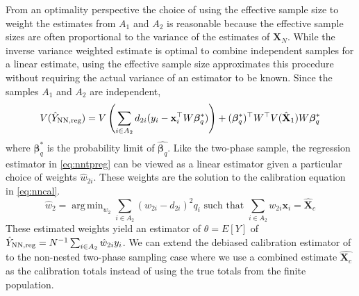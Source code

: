 \documentclass[12pt]{article}
\DeclareMathOperator*{\argmin}{arg\,min}
\renewcommand{\bf}[1]{\mathbf{#1}}
\begin{document}
From an optimality perspective the choice of using the effective sample size to
weight the estimates from $A_1$ and $A_2$ is reasonable because the
effective sample sizes are often proportional to the variance of the estimates 
of $\bf X_N$. While the inverse variance weighted estimate is optimal
to combine independent samples for a linear estimate, using the effective sample
size approximates this procedure without requiring the actual variance of an
estimator to be known. Since the samples $A_1$ and $A_2$ are independent, 
$$
V(\hat Y_{\rm NN, reg}) = 
V\left(\sum_{i \in A_2} d_{2i}(y_i - \bf x_i^\top W\bm \beta^*_q)\right)
+ (\bm \beta^*_q)^\top W^\top V(\hat{\bf X}_1) W \bm \beta_q^*
$$
where $\bm \beta_q^*$ is the probability limit of $\hat{\bm \beta_q}$. Like the
two-phase sample, the regression estimator in \eqref{eq:nntpreg} can be viewed
as a linear estimator given a particular choice of weights $\hat w_{2i}$. These
weights are the solution to the calibration equation in \eqref{eq:nncal}.
\begin{equation}\label{eq:nncal}
  \hat w_2 = \argmin_{w_2} \sum_{i \in A_2} (w_{2i} - d_{2i})^2 q_i 
  \text{ such that } \sum_{i \in A_2} w_{2i} \bf x_i = \hat{\bf X}_c
\end{equation}
These estimated weights yield an estimator of $\theta = E[Y]$ of 
$\hat Y_{\rm NN, reg} = N^{-1} \sum_{i \in A_2} \hat w_{2i} y_i$. 
We can extend the debiased calibration estimator of \cite{kwon2024debiased} to
the non-nested two-phase sampling case where we use a combined estimate
$\hat{\bm X_c}$ as the calibration totals instead of using the true totals from
the finite population.

\end{document}
